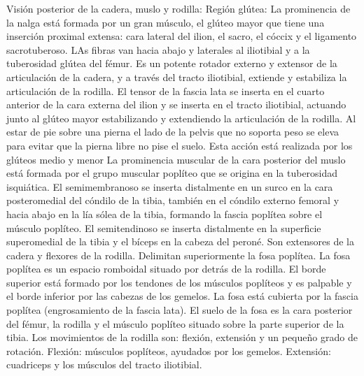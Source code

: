 Visión posterior de la cadera, muslo y rodilla:
Región glútea: La prominencia de la nalga está formada por un gran músculo, el glúteo mayor que tiene una inserción proximal extensa: cara lateral del ilion, el sacro, el cóccix y el ligamento sacrotuberoso. LAs fibras  van hacia abajo y laterales al iliotibial y a la tuberosidad glútea del fémur. Es un potente rotador externo y extensor de la articulación de la cadera, y a través del tracto iliotibial, extiende y estabiliza la articulación de la rodilla. El tensor de la fascia lata se inserta en el cuarto anterior de la cara externa del ilion y se inserta en el tracto iliotibial, actuando junto al glúteo mayor estabilizando y extendiendo la articulación de la rodilla.
Al estar de pie sobre una pierna el lado de la pelvis que no soporta peso se eleva para evitar que la pierna libre no pise el suelo. Esta acción está realizada por los glúteos medio y menor
La prominencia muscular de la cara posterior del muslo está formada por el grupo muscular poplíteo que se origina en la tuberosidad isquiática. El semimembranoso se inserta distalmente en un surco en la cara posteromedial del cóndilo de la tibia, también en el cóndilo externo femoral y hacia abajo en la lía sólea de la tibia, formando la fascia poplítea sobre el músculo poplíteo. El semitendinoso se inserta distalmente en la superficie superomedial de la tibia y el bíceps en la cabeza del peroné. Son extensores de la cadera y flexores de la rodilla. Delimitan superiormente la fosa poplítea.
La fosa poplítea es un espacio romboidal situado por detrás de la rodilla. El borde superior está formado por los tendones de los músculos poplíteos y es palpable y el borde inferior por las cabezas de los gemelos. La fosa está cubierta por la fascia poplítea (engrosamiento de la fascia lata). El suelo de la fosa es la cara posterior del fémur, la rodilla y el músculo poplíteo situado sobre la parte superior de la tibia.
Los movimientos de la rodilla son: flexión, extensión y un pequeño grado de rotación. Flexión: músculos poplíteos, ayudados por los gemelos. Extensión: cuadriceps y los músculos del tracto iliotibial.

